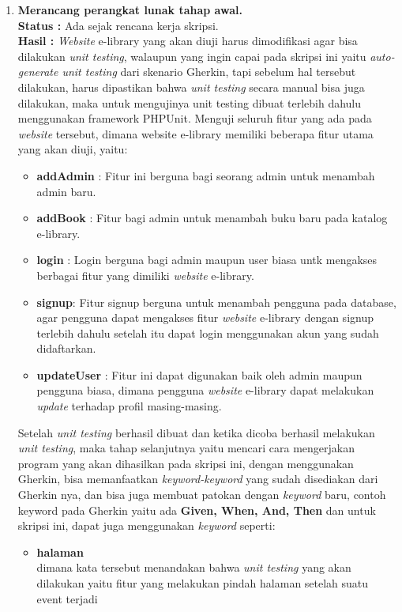 \documentclass[a4paper,twoside]{article}
\begin{document}
\begin{enumerate}
        
        \item \textbf{Merancang perangkat lunak tahap awal.}\\
        \textbf{Status :} Ada sejak rencana kerja skripsi.\\
        \textbf{Hasil :} \textit{Website} e-library yang akan diuji harus dimodifikasi agar bisa dilakukan \textit{unit testing}, walaupun yang ingin capai pada skripsi ini yaitu \textit{auto-generate unit testing} dari skenario Gherkin, tapi sebelum hal tersebut dilakukan, harus dipastikan bahwa \textit{unit testing} secara manual bisa juga dilakukan, maka untuk mengujinya unit testing dibuat terlebih dahulu menggunakan framework PHPUnit. Menguji seluruh fitur yang ada pada \textit{website} tersebut, dimana website e-library memiliki beberapa fitur utama yang akan diuji, yaitu:
        \begin{itemize}
            \item \textbf{addAdmin} : Fitur ini berguna bagi seorang admin untuk menambah admin baru.
            \item \textbf{addBook} : Fitur bagi admin untuk menambah buku baru pada katalog e-library.
            \item \textbf{login} : Login berguna bagi admin maupun user biasa untk mengakses berbagai fitur yang dimiliki \textit{website} e-library.
            \item \textbf{signup}: Fitur signup berguna untuk menambah pengguna pada database, agar pengguna dapat mengakses fitur \textit{website} e-library dengan signup terlebih dahulu setelah itu dapat login menggunakan akun yang sudah didaftarkan.
            \item \textbf{updateUser} : Fitur ini dapat digunakan baik oleh admin maupun pengguna biasa, dimana pengguna \textit{website} e-library dapat melakukan \textit{update} terhadap profil masing-masing.
        \end{itemize}
Setelah \textit{unit testing} berhasil dibuat dan ketika dicoba berhasil melakukan \textit{unit testing}, maka tahap selanjutnya yaitu mencari cara mengerjakan program yang akan dihasilkan pada skripsi ini, dengan menggunakan Gherkin, bisa memanfaatkan \textit{keyword-keyword} yang sudah disediakan dari Gherkin nya, dan bisa juga membuat patokan dengan \textit{keyword} baru, contoh keyword pada Gherkin yaitu ada \textbf{Given, When, And, Then} dan untuk skripsi ini, dapat juga menggunakan \textit{keyword} seperti:
\begin{itemize}
	\item \textbf{halaman}\\ dimana kata tersebut menandakan bahwa \textit{unit testing} yang akan dilakukan yaitu fitur yang melakukan pindah halaman setelah suatu event terjadi

\end{itemize}
\end{enumerate}
\end{document}
